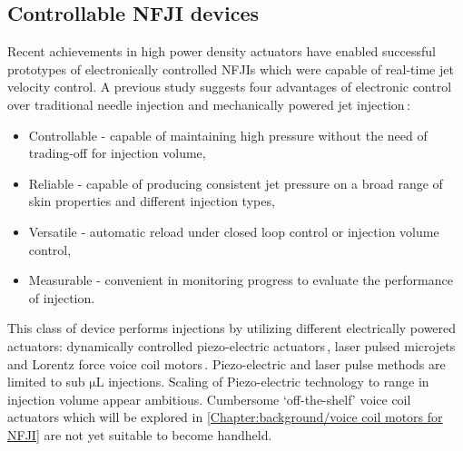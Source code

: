     \subsection{Controllable \acs{NFJI} devices}    \label{Chapter:background/needle-free jet injection/Controllable NFJI}
    
        Recent achievements in high power density actuators have enabled successful prototypes of electronically controlled \acsp{NFJI} which were capable of real-time jet velocity control. A previous study suggests four advantages of electronic control over traditional needle injection and mechanically powered jet injection\,\cite{henmond2013}:
        
        \begin{itemize}
            \item Controllable - capable of maintaining high pressure without the need of trading-off for injection volume,
            \item Reliable - capable of producing consistent jet pressure on a broad range of skin properties and different injection types,
            \item Versatile - automatic reload under closed loop control or injection volume control,
            \item Measurable - convenient in monitoring progress to evaluate the performance of injection.
        \end{itemize}
        
        This class of device performs injections by utilizing different electrically powered actuators: dynamically controlled piezo-electric actuators\,\cite{Stachowiak2009}, laser pulsed microjets\,\cite{tawaga2013, park2012} and Lorentz force voice coil motors\,\cite{taberner2006,hemond2006}. Piezo-electric and laser pulse methods are limited to sub $\mathrm{\mu L}$ injections. Scaling of Piezo-electric technology to   range in injection volume appear ambitious. Cumbersome ‘off-the-shelf’ voice coil actuators which will be explored in \ref{Chapter:background/voice coil motors for NFJI} are not yet suitable to become handheld.

